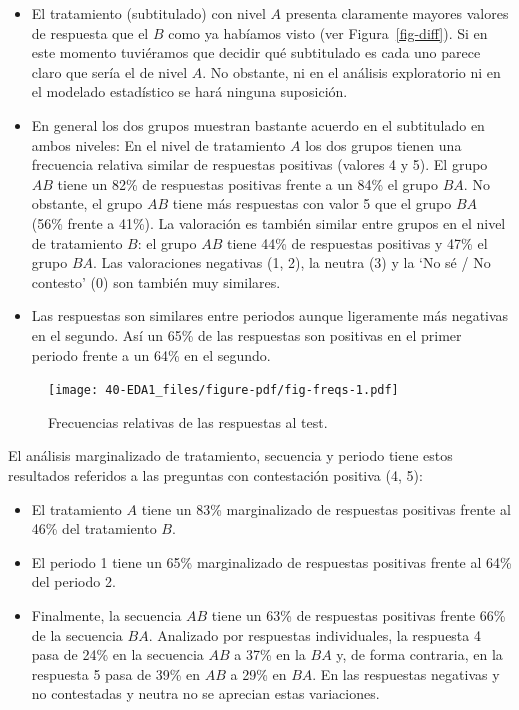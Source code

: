 \documentclass[
  12pt,
  a4paper,
  extrafontsizes,
  onecolumn,
  openright]{memoir}
\begin{document}
\begin{itemize}
\item
  El tratamiento (subtitulado) con nivel \(A\) presenta claramente
  mayores valores de respuesta que el \(B\) como ya habíamos visto (ver
  Figura~\ref{fig-diff}). Si en este momento tuviéramos que decidir qué
  subtitulado es cada uno parece claro que sería el de nivel \(A\). No
  obstante, ni en el análisis exploratorio ni en el modelado estadístico
  se hará ninguna suposición.
\item
  En general los dos grupos muestran bastante acuerdo en el subtitulado
  en ambos niveles: En el nivel de tratamiento \(A\) los dos grupos
  tienen una frecuencia relativa similar de respuestas positivas
  (valores 4 y 5). El grupo \(AB\) tiene un 82\% de respuestas positivas
  frente a un 84\% el grupo \(BA\). No obstante, el grupo \(AB\) tiene
  más respuestas con valor 5 que el grupo \(BA\) (56\% frente a 41\%).
  La valoración es también similar entre grupos en el nivel de
  tratamiento \(B\): el grupo \(AB\) tiene 44\% de respuestas positivas
  y 47\% el grupo \(BA\). Las valoraciones negativas (1, 2), la neutra
  (3) y la \enquote*{No sé / No contesto} (0) son también muy similares.
\item
  Las respuestas son similares entre periodos aunque ligeramente más
  negativas en el segundo. Así un 65\% de las respuestas son positivas
  en el primer periodo frente a un 64\% en el segundo.
\end{itemize}

\begin{figure}[h]

{\centering \texttt{[image: 40-EDA1\_files/figure-pdf/fig-freqs-1.pdf]}

}

\caption{\label{fig-freqs}Frecuencias relativas de las respuestas al
test.}

\end{figure}

El análisis marginalizado de tratamiento, secuencia y periodo tiene
estos resultados referidos a las preguntas con contestación positiva (4,
5):

\begin{itemize}
\item
  El tratamiento \(A\) tiene un 83\% marginalizado de respuestas
  positivas frente al 46\% del tratamiento \(B\).
\item
  El periodo 1 tiene un 65\% marginalizado de respuestas positivas
  frente al 64\% del periodo 2.
\item
  Finalmente, la secuencia \(AB\) tiene un 63\% de respuestas positivas
  frente 66\% de la secuencia \(BA\). Analizado por respuestas
  individuales, la respuesta 4 pasa de 24\% en la secuencia \(AB\) a
  37\% en la \(BA\) y, de forma contraria, en la respuesta 5 pasa de
  39\% en \(AB\) a 29\% en \(BA\). En las respuestas negativas y no
  contestadas y neutra no se aprecian estas variaciones.
\end{itemize}
\end{document}
